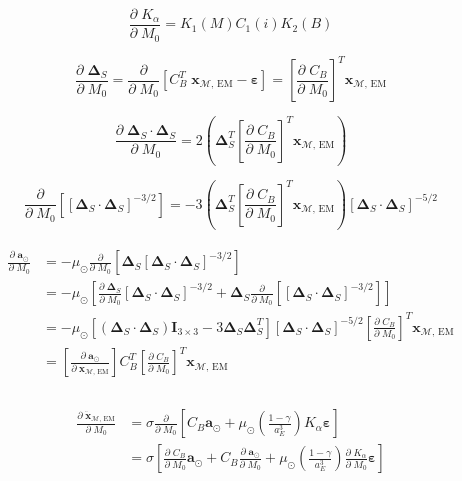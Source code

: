 \documentclass[]{article}
\newcommand{\pd}[2]{\frac{\partial\;#1}{\partial\;#2}}
\newcommand{\pddown}[2]{\frac{\partial}{\partial\;#2} \left[ #1 \right] }
\begin{document}
	\begin{equation*}
		\pd{K_\alpha}{M_0} = K_1(M) C_1(i) K_2(B)
	\end{equation*}
	
	\begin{equation*}
		\pd{\boldsymbol{\Delta}_S}{M_0} = \pddown{C_B^T \; \mathbf{x}_{\mathcal{M}\text{, EM}} - \boldsymbol{\varepsilon}}{M_0} = \left[ \pd{C_B}{M_0} \right]^T \mathbf{x}_{\mathcal{M}\text{, EM}}
	\end{equation*}
	
	\begin{equation*}
		\pd{\boldsymbol{\Delta}_S \cdot \boldsymbol{\Delta}_S}{M_0} = 2\left( \boldsymbol{\Delta}_S^T \left[ \pd{C_B}{M_0} \right]^T \mathbf{x}_{\mathcal{M}\text{, EM}} \right)
	\end{equation*}
	
	\begin{equation*}
		\pddown{ [\boldsymbol{\Delta}_S \cdot \boldsymbol{\Delta}_S]^{-3/2} }{M_0} = -3 \left( \boldsymbol{\Delta}_S^T \left[ \pd{C_B}{M_0} \right]^T \mathbf{x}_{\mathcal{M}\text{, EM}} \right) [\boldsymbol{\Delta}_S \cdot \boldsymbol{\Delta}_S]^{-5/2}
	\end{equation*}
	
	\begin{align}
	\begin{split}
		\pd{\mathbf{a}_{\odot}}{M_0} 
		&= -\mu_\odot \pddown{ \boldsymbol{\Delta}_S [\boldsymbol{\Delta}_S \cdot \boldsymbol{\Delta}_S]^{-3/2} }{M_0} \\
		&= -\mu_\odot \left[ \pd{ \boldsymbol{\Delta}_S }{M_0}[\boldsymbol{\Delta}_S \cdot \boldsymbol{\Delta}_S]^{-3/2} + \boldsymbol{\Delta}_S  \pddown{ [\boldsymbol{\Delta}_S \cdot \boldsymbol{\Delta}_S]^{-3/2} }{M_0} \right] \\
		&= -\mu_\odot \left[ (\boldsymbol{\Delta}_S \cdot \boldsymbol{\Delta}_S)\mathbf{I}_{3\times 3} - 3 \boldsymbol{\Delta}_S \boldsymbol{\Delta}_S^T \right] [\boldsymbol{\Delta}_S \cdot \boldsymbol{\Delta}_S]^{-5/2} \left[ \pd{C_B}{M_0} \right]^T \mathbf{x}_{\mathcal{M}\text{, EM}} \\
		&= \left[\pd{\mathbf{a}_{\odot}}{ \mathbf{x}_{\mathcal{M}\text{, EM}} }\right] C_B^T \left[ \pd{C_B}{M_0} \right]^T \mathbf{x}_{\mathcal{M}\text{, EM}} \\
	\end{split}
	\end{align}
	
	\begin{align}
	\begin{split}
		\pd{\ddot{\mathbf{x}}_{\mathcal{M}\text{, EM}}}{M_0} 
		&= \sigma \pddown{C_B  \mathbf{a}_{\odot} + \mu_\odot \left(\frac{1-\gamma}{a_E^3}\right) K_\alpha \boldsymbol{\varepsilon}}{M_0} \\
		&= \sigma \left[ \pd{C_B}{M_0} \mathbf{a}_{\odot} + C_B  \pd{\mathbf{a}_{\odot}}{M_0} + \mu_\odot \left(\frac{1-\gamma}{a_E^3}\right) \pd{K_\alpha}{M_0} \boldsymbol{\varepsilon} \right] \\
	\end{split}
	\end{align}
	
\end{document}
